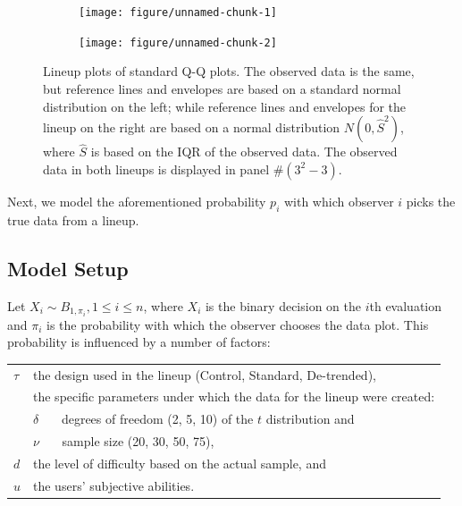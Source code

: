 \documentclass{article}\usepackage[]{graphicx}\usepackage[]{color}
\newenvironment{knitrout}{}{} %
\newcommand{\alnote}[1]{\todo[inline,color=green!40]{#1}}
\begin{document}
\begin{figure}[hbt]


\begin{subfigure}{0.5\textwidth}
\begin{knitrout}
\color{fgcolor}
\texttt{[image: figure/unnamed-chunk-1]} 

\end{knitrout}

\end{subfigure}
\begin{subfigure}{0.5\textwidth}
\begin{knitrout}
\color{fgcolor}
\texttt{[image: figure/unnamed-chunk-2]} 

\end{knitrout}

\end{subfigure}
\caption{\label{fig:lps} Lineup plots of standard Q-Q plots. The observed data is the same, but  reference lines and envelopes are based on a standard normal distribution on the left; while  reference lines and envelopes for the lineup on the right are based on a normal distribution $N(0, \widehat{S}^2)$, where $\widehat{S}$ is based on the IQR of the observed data.
The observed data in both lineups is displayed in panel \#$(3^2 - 3)$. }
\end{figure}

Next, we model the aforementioned probability $p_i$ with which observer $i$ picks the true data from a lineup. 


\subsection{Model Setup}


Let $X_i \sim B_{1, \pi_i}, 1 \le i \le n$, where $X_i$ is the binary decision on the $i$th evaluation and $\pi_i$ is the probability with which the observer chooses the data plot. This probability is influenced by a number of factors:

\begin{center}
\begin{tabular}{lp{5in}}
$\tau$ & the design used in the lineup (Control, Standard, De-trended), \\
&  the specific parameters under which the data for the lineup were created: \\
&  $\delta$ \ \ \ degrees of freedom (2, 5, 10) {of the $t$ distribution} and \\
&  $\nu$  \ \ \ sample size (20, 30, 50, 75), \\
$d$ &  the level of difficulty based on the actual sample, and \\
$u$ & the users' subjective abilities.
 \end{tabular}
\end{center}
%
\end{document}
